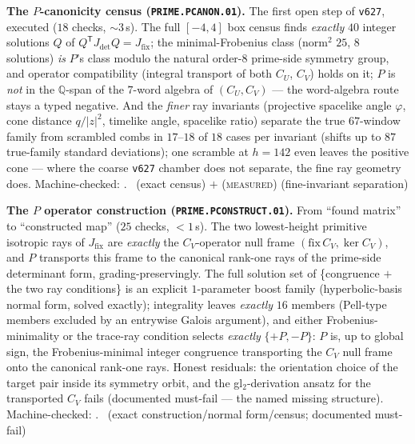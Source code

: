 \par\smallskip\noindent\textbf{The $P$-canonicity census
(\texttt{PRIME.PCANON.01}).}
The first open step of \texttt{v627}, executed ($18$ checks,
${\sim}3$\,s).  The full $[-4,4]$ box census finds \emph{exactly} $40$
integer solutions $Q$ of $Q^{\mathsf T}J_{\mathrm{det}}Q=
J_{\mathrm{fix}}$; the minimal-Frobenius class (norm$^2$ $25$, $8$
solutions) \emph{is} $P$'s class modulo the natural order-$8$
prime-side symmetry group, and operator compatibility (integral
transport of both $C_U$, $C_V$) holds on it; $P$ is \emph{not} in the
$\mathbb Q$-span of the $7$-word algebra of $(C_U,C_V)$ --- the
word-algebra route stays a typed negative.  And the \emph{finer} ray
invariants (projective spacelike angle $\varphi$, cone distance
$q/|z|^2$, timelike angle, spacelike ratio) separate the true
$67$-window family from scrambled combs in $17$--$18$ of $18$ cases
per invariant (shifts up to $87$ true-family standard deviations); one
scramble at $h=142$ even leaves the positive cone --- where the coarse
\texttt{v627} chamber does not separate, the fine ray geometry does.
Machine-checked: .
\mE\ (exact census) $+$ (\textsc{measured}) (fine-invariant
separation)
\par\smallskip


\par\smallskip\noindent\textbf{The $P$ operator construction
(\texttt{PRIME.PCONSTRUCT.01}).}
From ``found matrix'' to ``constructed map'' ($25$ checks, $<1$\,s).
The two lowest-height primitive isotropic rays of $J_{\mathrm{fix}}$
are \emph{exactly} the $C_V$-operator null frame $(\mathrm{fix}\,C_V,
\ker C_V)$, and $P$ transports this frame to the canonical rank-one
rays of the prime-side determinant form, grading-preservingly.  The
full solution set of \{congruence $+$ the two ray conditions\} is an
explicit $1$-parameter boost family (hyperbolic-basis normal form,
solved exactly); integrality leaves \emph{exactly} $16$ members
(Pell-type members excluded by an entrywise Galois argument), and
either Frobenius-minimality or the trace-ray condition selects
\emph{exactly} $\{+P,-P\}$: $P$ is, up to global sign, the
Frobenius-minimal integer congruence transporting the $C_V$ null frame
onto the canonical rank-one rays.  Honest residuals: the orientation
choice of the target pair inside its symmetry orbit, and the
gl$_2$-derivation ansatz for the transported $C_V$ fails (documented
must-fail --- the named missing structure).
Machine-checked: .
\mE\ (exact construction/normal form/census; documented must-fail)
\par\smallskip


